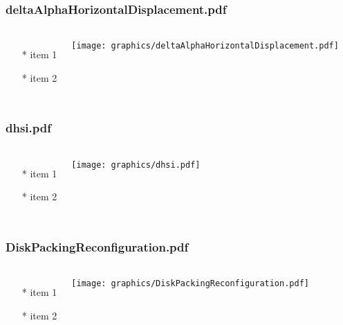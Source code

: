 \begin{frame} \frametitle{deltaAlphaHorizontalDisplacement.pdf}
    \begin{columns}[c]
        \begin{itemize}
            \item[*] item 1
            \item[*] item 2
        \end{itemize}
        \begin{minipage}{\linewidth}
            \begin{center}
            \texttt{[image: graphics/deltaAlphaHorizontalDisplacement.pdf]}
            \label{gfx:deltaAlphaHorizontalDisplacement.pdf}
            \end{center}
        \end{minipage}
    \end{columns}
\end{frame}
\begin{frame} \frametitle{dhsi.pdf}
    \begin{columns}[c]
        \begin{itemize}
            \item[*] item 1
            \item[*] item 2
        \end{itemize}
        \begin{minipage}{\linewidth}
            \begin{center}
            \texttt{[image: graphics/dhsi.pdf]}
            \label{gfx:dhsi.pdf}
            \end{center}
        \end{minipage}
    \end{columns}
\end{frame}
\begin{frame} \frametitle{DiskPackingReconfiguration.pdf}
    \begin{columns}[c]
        \begin{itemize}
            \item[*] item 1
            \item[*] item 2
        \end{itemize}
        \begin{minipage}{\linewidth}
            \begin{center}
            \texttt{[image: graphics/DiskPackingReconfiguration.pdf]}
            \label{gfx:DiskPackingReconfiguration.pdf}
            \end{center}
        \end{minipage}
    \end{columns}
\end{frame}
